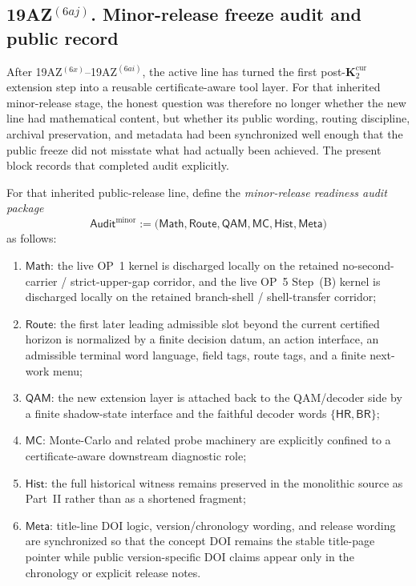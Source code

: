 \subsection*{19AZ$^{(6aj)}$. Minor-release freeze audit and public record}
\label{sec:minor-release-preparation-audit-and-freeze-checklist}
After 19AZ$^{(6x)}$--19AZ$^{(6ai)}$, the active line has turned the first post-\(\mathbf K_2^{\mathrm{cur}}\) extension step into a reusable certificate-aware tool layer. For that inherited minor-release stage, the honest question was therefore no longer whether the new line had mathematical content, but whether its public wording, routing discipline, archival preservation, and metadata had been synchronized well enough that the public freeze did not misstate what had actually been achieved. The present block records that completed audit explicitly.

\begin{definition}
\label{def:minor-release-readiness-audit-package}
For that inherited public-release line, define the \emph{minor-release readiness audit package}
\[
  \mathsf{Audit}^{\mathrm{minor}}
  :=
  \bigl(\mathsf{Math},\mathsf{Route},\mathsf{QAM},\mathsf{MC},\mathsf{Hist},\mathsf{Meta}\bigr)
\]
as follows:
\begin{enumerate}[label=(\roman*)]
  \item \(\mathsf{Math}\): the live OP~1 kernel is discharged locally on the retained no-second-carrier / strict-upper-gap corridor, and the live OP~5 Step~(B) kernel is discharged locally on the retained branch-shell / shell-transfer corridor;
  \item \(\mathsf{Route}\): the first later leading admissible slot beyond the current certified horizon is normalized by a finite decision datum, an action interface, an admissible terminal word language, field tags, route tags, and a finite next-work menu;
  \item \(\mathsf{QAM}\): the new extension layer is attached back to the QAM/decoder side by a finite shadow-state interface and the faithful decoder words \(\{\mathsf{HR},\mathsf{BR}\}\);
  \item \(\mathsf{MC}\): Monte-Carlo and related probe machinery are explicitly confined to a certificate-aware downstream diagnostic role;
  \item \(\mathsf{Hist}\): the full historical witness remains preserved in the monolithic source as Part~II rather than as a shortened fragment;
  \item \(\mathsf{Meta}\): title-line DOI logic, version/chronology wording, and release wording are synchronized so that the concept DOI remains the stable title-page pointer while public version-specific DOI claims appear only in the chronology or explicit release notes.
\end{enumerate}
\end{definition}


